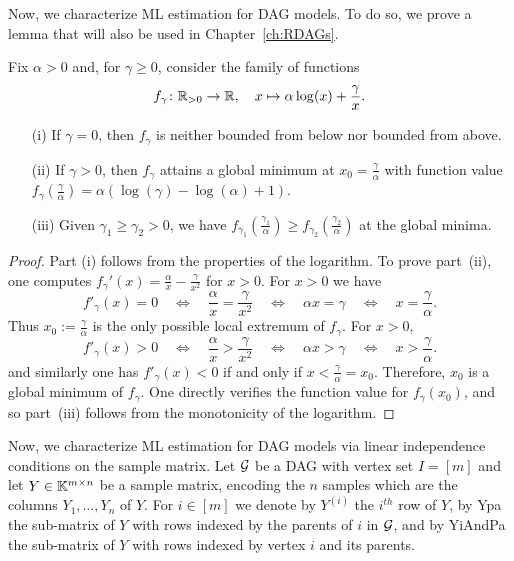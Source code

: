 Now, we characterize ML estimation for DAG models. To do so, we prove a lemma that will also be used in Chapter~\ref{ch:RDAGs}.

\begin{lemma}\label{lem:MinimumOfMinusLogLikelihoodRDAG}
	Fix $\alpha > 0$ and, for $\gamma \geq 0$, consider the family of functions
	\[ f_{\gamma} \colon \mathbb R_{>0} \to \mathbb R, \quad x \mapsto \alpha \log(x) + \frac{\gamma}{x}.\]
	\begin{itemize}\itemsep 3pt
		\item[(i)] If $\gamma = 0$, then $f_\gamma$ is neither bounded from below nor bounded from above.
		
		\item[(ii)] If $\gamma > 0$, then $f_{\gamma}$ attains a global minimum at $x_0 = \frac{\gamma}{\alpha}$ with function value $f_{\gamma}(\frac{\gamma}{\alpha}) = \alpha(\log(\gamma) - \log(\alpha) + 1)$. 
		
		\item[(iii)] Given $\gamma_1 \geq \gamma_2 > 0$, we have $f_{\gamma_1}(\frac{\gamma_1}{\alpha}) \geq f_{\gamma_2}(\frac{\gamma_2}{\alpha})$ at the global minima.
	\end{itemize}
\end{lemma}

\begin{proof}
	Part (i) follows from the properties of the logarithm. To prove part~(ii), one computes $f_{\gamma}'(x) = \frac{\alpha}{x} - \frac{\gamma}{x^2}$ for $x > 0$. For $x>0$ we have
	\[ f'_{\gamma}(x) = 0  \quad \Leftrightarrow \quad
	\frac{\alpha}{x} = \frac{\gamma}{x^2} \quad \Leftrightarrow \quad
	\alpha x = \gamma \quad \Leftrightarrow \quad
	x = \frac{\gamma}{\alpha}.\]
	Thus $x_0 := \frac{\gamma}{\alpha}$ is the only possible local extremum of $f_\gamma$. For $x>0$,
	\[ f'_{\gamma}(x) > 0  \quad \Leftrightarrow \quad
	\frac{\alpha}{x} > \frac{\gamma}{x^2} \quad \Leftrightarrow \quad
	\alpha x > \gamma \quad \Leftrightarrow \quad
	x > \frac{\gamma}{\alpha}.\]
	and similarly one has $f'_{\gamma}(x) < 0$ if and only if $x < \frac{\gamma}{\alpha} = x_0$. Therefore, $x_0$ is a global minimum of $f_\gamma$. One directly verifies the function value for $f_{\gamma}(x_0)$, and so part~(iii) follows from the monotonicity of the logarithm.
\end{proof}


Now, we characterize ML estimation for DAG models via linear independence conditions on the sample matrix. Let $\mathcal{G}$ be a DAG with vertex set  $I = [m]$ and let $Y \in \mathbb K^{m \times n}$ be a sample matrix, encoding the $n$ samples which are the columns $Y_1, \ldots, Y_n$ of $Y$. For $i \in [m]$ we denote by $Y^{(i)}$ the $i^{th}$ row of $Y$, by \gls{Ypa} the sub-matrix of $Y$ with rows indexed by the parents of $i$ in $\mathcal{G}$, and by \gls{YiAndPa} the sub-matrix of $Y$ with rows indexed by vertex $i$ and its parents.

